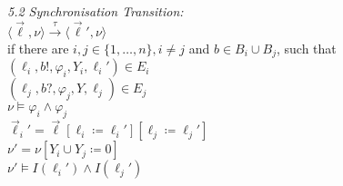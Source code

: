\begin{tcolorbox}[colback=kapiteleins!5!white, colframe=orange!75!black, title=\textbf{Networks of Timed Automata}, left=0mm, right=0mm, top=0mm, bottom=0mm]
\begin{minipage}[t]{0.5\textwidth}
\end{minipage}
\vrule
\hspace{0.2cm}
\begin{minipage}[t]{0.45\textwidth}
\emph{5.2 Synchronisation Transition:}\\
$\langle \vec{\ell}, \nu \rangle \xrightarrow{\tau} \langle \vec{\ell}', \nu \rangle$
\\if there are $i,j \in \{1, \ldots, n\}, i \neq j$ and $ b \in B_i \cup B_j$, such that\\
$\left( \ell_i, b!, \varphi_i, Y_i, \ell_i' \right) \in E_i$\\
$\left( \ell_j, b?, \varphi_j, Y, \ell_j \right) \in E_j$\\
$\nu \models \varphi_i \land \varphi_j$\\
$\vec{\ell}_i ' = \vec{\ell} [ \ell_i \coloneqq \ell_i '] [ \ell_j \coloneqq \ell_j ' ]$\\
$\nu' = \nu \left[ Y_i \cup Y_j \coloneqq 0 \right]$\\
$\nu' \models I(\ell_i') \land I(\ell_j')$
\end{minipage}
\end{tcolorbox}

